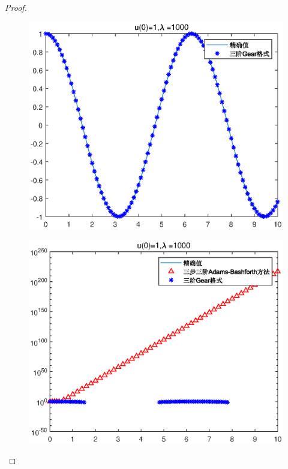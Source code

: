 \documentclass{article}%
\begin{document}
\begin{proof}
\begin{figure}
	\includegraphics[width=1\linewidth]{pic/week7_1_11.eps}
	\label{Fig:11}
	\caption{} 
\end{figure}
\begin{figure}
	\includegraphics[width=1\linewidth]{pic/week7_1_12.eps}
	\label{Fig:12}
	\caption{} 
\end{figure}

	
	
\end{proof}
\end{document}
